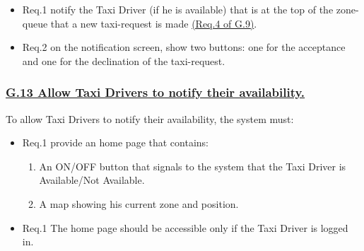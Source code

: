 				\begin{itemize}
					\item \lbrack Req.1\rbrack \label{sec:fr1_g12} notify the Taxi Driver (if he is available) that is at the top of the zone-queue that a new taxi-request is made \hyperref[sec:fr4_g9]{(Req.4 of G.9)}.
					\item \lbrack Req.2\rbrack \label{sec:fr2_g12} on the notification screen, show two buttons: one for the acceptance and one for the declination of the taxi-request.
				\end{itemize}


			\subsubsection{\lbrack \hyperref[sec:g13]{G.13 Allow Taxi Drivers to notify their availability.}\rbrack}\label{sec:frs13}
			To allow Taxi Drivers to notify their availability, the system must:
				\begin{itemize}
					\item \lbrack Req.1\rbrack \label{sec:fr1_g13} provide an home page that contains:
						\begin{enumerate}
							\item An ON/OFF button that signals to the system that the Taxi Driver is Available/Not Available.
							\item A map showing his current zone and position.
						\end{enumerate}
					\item \lbrack Req.1\rbrack \label{sec:fr1_g13} The home page should be accessible only if the Taxi Driver is logged in.
				\end{itemize}
